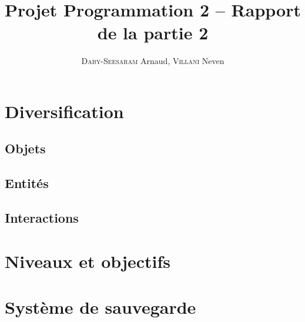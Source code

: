 \documentclass[a4paper,french]{article}
\title{Projet Programmation 2 -- Rapport de la partie 2}
\author{\textsc{Daby-Seesaram} Arnaud, \textsc{Villani} Neven}
\date{}
\begin{document}
\maketitle

\section{Diversification}

\subsection{Objets}

\subsection{Entit\'es}

\subsection{Interactions}

\section{Niveaux et objectifs}

\section{Syst\`eme de sauvegarde}
\end{document}

